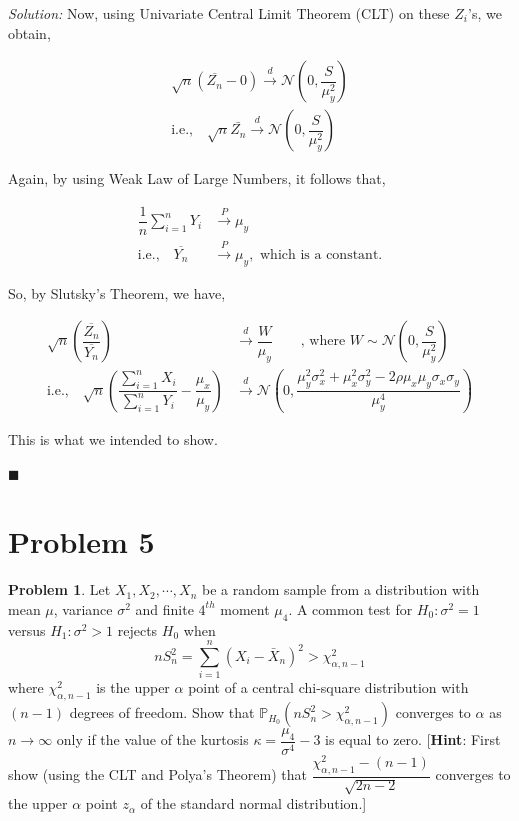 \documentclass[12pt]{article}
\newcommand{\prob}{\mathbb{P}}
\newcommand{\normal}{\mathcal{N}}
\theoremstyle{definition}
\newtheorem*{prb}{Problem}
\newenvironment{problem}{\begin{tcolorbox}[colback=blue!5!white,colframe=blue!75!black, parbox = true] \begin{prb}  }{\end{prb}\end{tcolorbox} }
\newenvironment{answer}{\textit{Solution: }\quad }{ \hfill $\blacksquare$}
\numberwithin{equation}{section}
\begin{document}
\begin{answer}
Now, using Univariate Central Limit Theorem (CLT) on these $Z_i$'s, we obtain,

\begin{align*}
    \sqrt{n}(\overline{Z_n}-0)\xrightarrow{d}\normal\left(0,\dfrac{S}{\mu_y^2}\right)\\
    \text{i.e.,}\quad \sqrt{n}\bar{Z_n}\xrightarrow{d}\normal\left(0,\dfrac{S}{\mu_y^2}\right)
\end{align*}

Again, by using Weak Law of Large Numbers, it follows that,

\begin{align*}
    \dfrac{1}{n}\sum_{i=1}^n Y_i & \xrightarrow{P} \mu_y\\
    \text{i.e.,}\quad \overline{Y_n} & \xrightarrow{P} \mu_y,\text{ which is a constant.} 
\end{align*}

So, by Slutsky's Theorem, we have, 

\begin{align*}
    \sqrt{n}\left(\dfrac{\overline{Z_n}}{\overline{Y_n}}\right) 
    & \xrightarrow{d} \dfrac{W}{\mu_y} \qquad \text{, where } W \sim \normal\left(0,\dfrac{S}{\mu_y^2}\right)\\
    \text{i.e.,}\quad  \sqrt{n}\left( \dfrac{\sum_{i=1}^n X_i}{\sum_{i=1}^n Y_i} - \dfrac{\mu_x}{\mu_y} \right) 
    & \xrightarrow{d}\normal\left(0,\dfrac{\mu_y^2\sigma_x^2 + \mu_x^2\sigma_y^2 - 2\rho\mu_x\mu_y\sigma_x\sigma_y}{\mu_y^4}\right) 
\end{align*}

This is what we intended to show.

\end{answer}

\pagebreak
\section{Problem 5}


\begin{problem}
Let $X_1,X_2,\cdots,X_n$ be a random sample from a distribution with mean $\mu$, variance $\sigma^2$ and finite $4^{th}$ moment $\mu_4$. A common test for $H_0 :\sigma^2= 1$ versus $H_1 :\sigma^2> 1$ rejects $H_0$ when 
$$nS_n^2 = \displaystyle\sum_{i=1}^n \left(X_i-\bar{X}_n\right)^2 > \chi_{\alpha,n-1}^2$$
where $\chi_{\alpha,n-1}^2$ is the upper $\alpha$ point of a central chi-square distribution with $(n-1)$ degrees of freedom. Show that $\prob_{H_0}\left( nS_n^2 > \chi_{\alpha,n-1}^2 \right)$ converges to $\alpha$ as $n \rightarrow\infty$ only if the value of the kurtosis $\kappa = \dfrac{\mu_4}{\sigma^4}-3$ is equal to zero. [\textbf{Hint}: First show (using the CLT and Polya’s Theorem) that $ \dfrac{\chi_{\alpha,n-1}^2-(n-1)}{\sqrt{2n-2}}$ converges to the upper $\alpha$ point $z_\alpha$ of the standard normal distribution.]
\end{problem}
\end{document}

